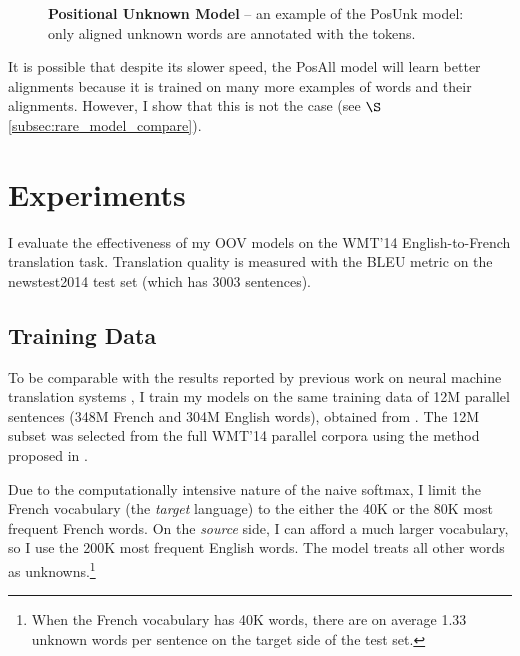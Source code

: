 \begin{figure}[tbh!]
\caption[Positional Unknown Model]{ {\bf Positional Unknown Model} -- 
an example of the PosUnk model: only aligned unknown words are annotated with the  tokens.}
\label{f:pos_unk}
\end{figure}

It is possible that despite its slower speed, the PosAll model will learn better alignments because 
it is trained on many more examples of words and their alignments. 
However, I show that this is not the case (see $\S$\ref{subsec:rare_model_compare}).


\section{Experiments}
\label{sec:exp}
I evaluate the effectiveness of my OOV models on the WMT'14 English-to-French translation 
task. Translation quality is measured with the BLEU metric \cite{Papineni02bleu} on the newstest2014 test set (which has 3003 sentences).

\subsection{Training Data}

To be comparable with the results reported by previous work on neural machine translation systems
\cite{sutskever14,cho14,bog15}, I train my models on 
the same training data of 12M parallel sentences (348M French and 304M English words), obtained from \cite{wmt14_en_fr}. 
The 12M subset was selected 
from the full WMT'14 parallel corpora using the method proposed in .%

Due to the computationally intensive nature of the naive softmax,
I limit the French vocabulary (the {\it target} language) 
to the either the 40K or the 80K most frequent French words. On the {\it source} side, 
I can afford a much larger vocabulary, so I use the 200K most frequent English words. 
The model treats all other words as unknowns.\footnote{When the French vocabulary has 40K words, there are
on average 1.33 unknown words per sentence on the target side of the test set.}


